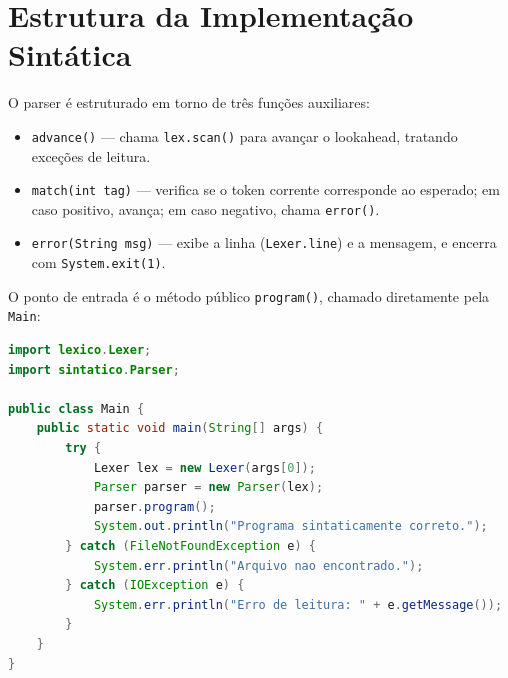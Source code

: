 \documentclass[12pt,a4paper]{article}
\begin{document}
\normalfont\normalsize

\section{Estrutura da Implementação Sintática}

O parser é estruturado em torno de três funções auxiliares:

\begin{itemize}
    \item \texttt{advance()} --- chama \texttt{lex.scan()} para avançar o lookahead, tratando exceções de leitura.
    \item \texttt{match(int tag)} --- verifica se o token corrente corresponde ao esperado; em caso positivo, avança; em caso negativo, chama \texttt{error()}.
    \item \texttt{error(String msg)} --- exibe a linha (\texttt{Lexer.line}) e a mensagem, e encerra com \texttt{System.exit(1)}.
\end{itemize}

O ponto de entrada é o método público \texttt{program()}, chamado diretamente pela \texttt{Main}:

\begin{lstlisting}[language=Java, caption=Classe principal (Main.java)]
import lexico.Lexer;
import sintatico.Parser;

public class Main {
    public static void main(String[] args) {
        try {
            Lexer lex = new Lexer(args[0]);
            Parser parser = new Parser(lex);
            parser.program();
            System.out.println("Programa sintaticamente correto.");
        } catch (FileNotFoundException e) {
            System.err.println("Arquivo nao encontrado.");
        } catch (IOException e) {
            System.err.println("Erro de leitura: " + e.getMessage());
        }
    }
}
\end{lstlisting}
\end{document}

